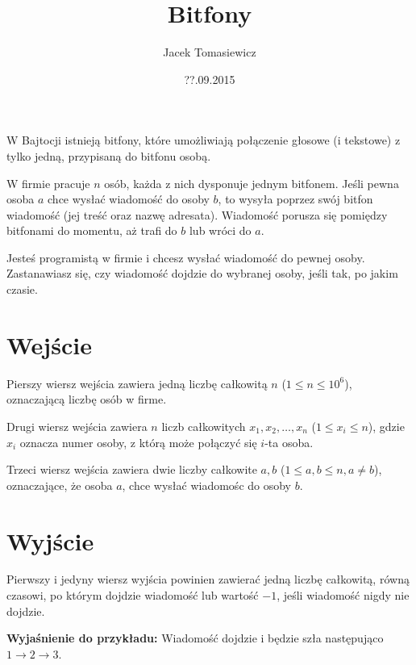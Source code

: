\documentclass[zad,zawodnik,utf8]{sinol}
\title{Bitfony}
\author{Jacek Tomasiewicz}
\date{??.09.2015}
\begin{document}
  \begin{tasktext}%
W Bajtocji istnieją bitfony, które umożliwiają połączenie głosowe (i tekstowe) z tylko jedną, przypisaną do bitfonu osobą.

W firmie pracuje $n$ osób, każda z nich dysponuje jednym bitfonem. Jeśli pewna osoba $a$ chce wysłać wiadomość do osoby $b$, to wysyła poprzez swój bitfon wiadomość (jej treść oraz nazwę adresata). Wiadomość porusza się pomiędzy bitfonami do momentu, aż trafi do $b$ lub wróci do $a$. 

Jesteś programistą w firmie i chcesz wysłać wiadomość do pewnej osoby. Zastanawiasz się, czy wiadomość dojdzie do wybranej osoby, jeśli tak, po jakim czasie. 

  \section{Wejście}
	
Pierszy wiersz wejścia zawiera jedną liczbę całkowitą $n$ ($1 \leq n \leq 10^6$), oznaczającą liczbę osób w firme. 

Drugi wiersz wejścia zawiera $n$ liczb całkowitych $x_1, x_2, \ldots, x_n$ ($1 \leq x_i \leq n$), gdzie $x_i$ oznacza numer osoby, z którą może połączyć się $i$-ta osoba.

Trzeci wiersz wejścia zawiera dwie liczby całkowite $a, b$ ($1 \leq a, b \leq n, a \neq b$), oznaczające, że osoba $a$, chce wysłać wiadomośc do osoby $b$.

  \section{Wyjście}
	Pierwszy i jedyny wiersz wyjścia powinien zawierać jedną liczbę całkowitą, równą czasowi, po którym dojdzie wiadomość lub wartość $-1$, jeśli wiadomość nigdy nie dojdzie.

     \makestandardexample

\medskip
\noindent
\textbf {Wyjaśnienie do przykładu:} Wiadomość dojdzie i będzie szła następująco $1 \rightarrow 2 \rightarrow 3$.

  \end{tasktext}
\end{document}
